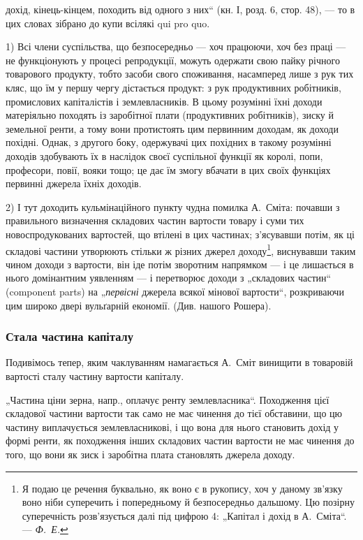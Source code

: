 \parcont{}  %
дохід, кінець-кінцем, походить від одного з них“ (кн. І, розд. 6,
стор. 48), — то в цих словах зібрано до купи всілякі qui pro quo.

1) Всі члени суспільства, що безпосередньо — хоч працюючи, хоч
без праці — не функціонують у процесі репродукції, можуть одержати
свою пайку річного товарового продукту, тобто засоби свого споживання,
насамперед лише з рук тих кляс, що їм у першу чергу дістається
продукт: з рук продуктивних робітників, промислових капіталістів і
землевласників. В цьому розумінні їхні доходи матеріяльно походять із
заробітної плати (продуктивних робітників), зиску й земельної ренти, а
тому вони протистоять цим первинним доходам, як доходи похідні.
Однак, з другого боку, одержувачі цих похідних в такому розумінні доходів
здобувають їх в наслідок своєї суспільної функції як королі,
попи, професори, повії, вояки тощо; це дає їм змогу вбачати в цих
своїх функціях первинні джерела їхніх доходів.

2) І тут доходить кульмінаційного пункту чудна помилка А.~Сміта:
почавши з правильного визначення складових частин вартости товару і
суми тих новоспродукованих вартостей, що втілені в цих частинах; з’ясувавши
потім, як ці складові частини утворюють стільки ж різних
джерел доходу\footnote{
Я подаю це речення буквально, як воно є в рукопису, хоч у даному зв’язку
воно ніби суперечить і попередньому й безпосередньо дальшому. Цю позірну
суперечність розв’язується далі під цифрою 4: „Капітал і дохід в А.~Сміта“.
— \emph{Ф.~Е.}
}, виснувавши таким чином доходи з вартости, він іде
потім зворотним напрямком — і це лишається в нього домінантним уявленням
— і перетворює доходи з „складових частин“ (component parts)
на „\emph{первісні} джерела всякої мінової вартости“, розкриваючи цим
широко двері вульґарній економії. (Див. нашого Рошера).

\subsubsection{Стала частина капіталу}

Подивімось тепер, яким чаклуванням намагається А.~Сміт винищити
в товаровій вартості сталу частину вартости капіталу.

„Частина ціни зерна, напр., оплачує ренту землевласника“. Походження
цієї складової частини вартости так само не має чинення до тієї
обставини, що цю частину виплачується землевласникові, і що вона для
нього становить дохід у формі ренти, як походження інших складових
частин вартости не має чинення до того, що вони як зиск і заробітна
плата становлять джерела доходу.

